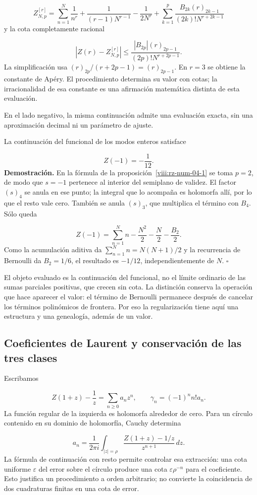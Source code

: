\[
Z_{N,p}^{[r]}=
\sum_{n=1}^N\frac1{n^r}+\frac1{(r-1)N^{r-1}}-\frac1{2N^r}
+\sum_{k=1}^p\frac{B_{2k}(r)_{2k-1}}{(2k)!N^{r+2k-1}}
\]
y la cota completamente racional

\[
\left|Z(r)-Z_{N,p}^{[r]}\right|
\leq\frac{|B_{2p}|(r)_{2p-1}}{(2p)!N^{r+2p-1}}.
\]
La simplificación usa \((r)_{2p}/(r+2p-1)=(r)_{2p-1}\). En \(r=3\) se obtiene la constante de Apéry. El procedimiento determina su valor con cotas; la irracionalidad de esa constante es una afirmación matemática distinta de esta evaluación.

En el lado negativo, la misma continuación admite una evaluación exacta, sin una aproximación decimal ni un parámetro de ajuste.

La continuación del funcional de los modos enteros satisface

\[
Z(-1)=-\frac1{12}.
\]
\textbf{Demostración.} En la fórmula de la proposición~\ref{viii:rz-num-04-1} se toma \(p=2\), de modo que \(s=-1\) pertenece al interior del semiplano de validez. El factor \((s)_4\) se anula en ese punto; la integral que lo acompaña es holomorfa allí, por lo que el resto vale cero. También se anula \((s)_3\), que multiplica el término con \(B_4\). Sólo queda

\[
Z(-1)=\sum_{n=1}^N n-\frac{N^2}{2}-\frac N2-\frac{B_2}{2}.
\]
Como la acumulación aditiva da \(\sum_{n=1}^N n=N(N+1)/2\) y la recurrencia de Bernoulli da \(B_2=1/6\), el resultado es \(-1/12\), independientemente de \(N\). \hfill\(\square\)

El objeto evaluado es la continuación del funcional, no el límite ordinario de las sumas parciales positivas, que crecen sin cota. La distinción conserva la operación que hace aparecer el valor: el término de Bernoulli permanece después de cancelar los términos polinómicos de frontera. Por eso la regularización tiene aquí una estructura y una genealogía, además de un valor.

\subsection{Coeficientes de Laurent y conservación de las tres clases}
Escribamos

\[
Z(1+z)-\frac1z=\sum_{n\geq0}a_nz^n,
\qquad \gamma_n=(-1)^nn!a_n.
\]
La función regular de la izquierda es holomorfa alrededor de cero. Para un círculo contenido en su dominio de holomorfía, Cauchy determina

\[
a_n=\frac1{2\pi i}\int_{|z|=\rho}
\frac{Z(1+z)-1/z}{z^{n+1}}\,dz.
\]
La fórmula de continuación con resto permite controlar esa extracción: una cota uniforme \(\varepsilon\) del error sobre el círculo produce una cota \(\varepsilon\rho^{-n}\) para el coeficiente. Esto justifica un procedimiento a orden arbitrario; no convierte la coincidencia de dos cuadraturas finitas en una cota de error.

